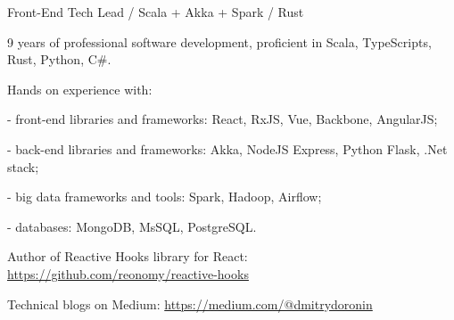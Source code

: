 \documentclass{resume}
\begin{document}

\begin{rSection}{Front-End Tech Lead / Scala + Akka + Spark / Rust}

9 years of professional software development, proficient in Scala, TypeScripts, Rust, Python, C\#.

\item Hands on experience with:
\item - front-end libraries and frameworks: 
React, RxJS, Vue, Backbone, AngularJS;
\item - back-end libraries and frameworks: 
Akka, NodeJS Express, Python Flask, .Net stack;
\item - big data frameworks and tools:
Spark, Hadoop, Airflow;
\item - databases:
MongoDB, MsSQL, PostgreSQL.

\item Author of Reactive Hooks library for React: \url{https://github.com/reonomy/reactive-hooks}
\item Technical blogs on Medium: \url{https://medium.com/@dmitrydoronin}

\end{rSection}

\end{document}
